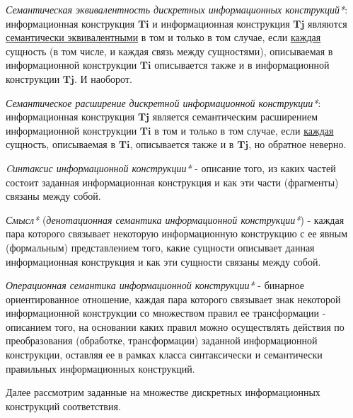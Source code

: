 \begin{SCn}
\end{SCn}

\textit{Семантическая эквивалентность дискретных информационных конструкций*}: информационная конструкция $\bm{Ti}$ и информационная конструкция $\bm{Tj}$ являются \underline{семантически эквивалентными} в том и только в том случае, если \underline{каждая} сущность (в том числе, и каждая связь между сущностями), описываемая в информационной конструкции $\bm{Ti}$ описывается также и в информационной конструкции $\bm{Tj}$. И наоборот.

\textit{Семантическое расширение дискретной информационной конструкции*}: информационная конструкция $\bm{Tj}$ является семантическим расширением информационной конструкции $\bm{Ti}$ в том и только в том случае, если \underline{каждая} сущность, описываемая в $\bm{Ti}$, описывается также и в $\bm{Tj}$, но обратное неверно.

\textit{Cинтаксис информационной конструкции*} - описание того, из каких частей состоит заданная информационная конструкция и как эти части (фрагменты) связаны между собой.

\textit{Смысл*} (\textit{денотационная семантика информационной конструкции*}) - каждая пара которого связывает некоторую информационную конструкцию с ее явным (формальным) представлением того, какие сущности описывает данная информационная конструкция и как эти сущности связаны между собой.

\textit{Операционная семантика информационной конструкции*} - бинарное ориентированное отношение, каждая пара которого связывает знак некоторой информационной конструкции со множеством правил ее трансформации - описанием того, на основании каких правил можно осуществлять действия по преобразования (обработке, трансформации) заданной информационной конструкции, оставляя ее в рамках класса синтаксически и семантически правильных информационных конструкций.

\begin{SCn}


\end{SCn}

Далее рассмотрим заданные на множестве дискретных информационных конструкций соответствия.

